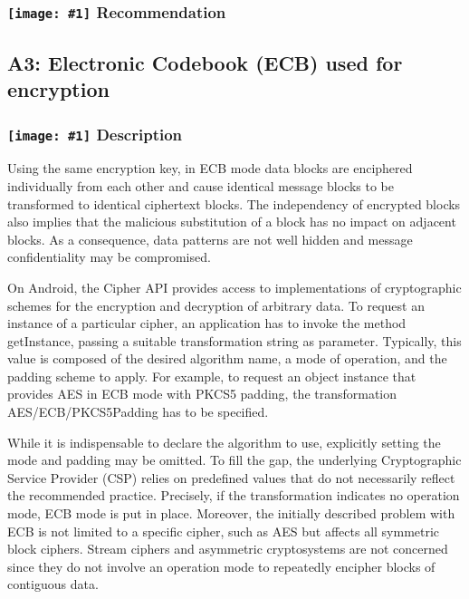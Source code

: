 \documentclass[12p]{article}
\newcommand{\icon}[1]{\texttt{[image: \#1]}}
\begin{document}
\subsubsection*{\protect\icon{/home/miki/Documents/GITHUB/AndroidPermissions/python/vulns/report_icons/basic_todo.png} Recommendation}

\subsection{A3: Electronic Codebook (ECB) used for encryption}
\subsubsection*{\protect\icon{/home/miki/Documents/GITHUB/AndroidPermissions/python/vulns/report_icons/basic_sheet.png} Description}

            Using the same encryption key, in ECB mode data blocks are enciphered individually 
            from each other and cause identical message blocks to be transformed to identical ciphertext 
            blocks. The independency of encrypted blocks also implies that the malicious substitution of a 
            block has no impact on adjacent blocks. As a consequence, data patterns are not well hidden and 
            message confidentiality may be compromised.
            
            On Android, the Cipher API provides access to implementations of cryptographic schemes
            for the encryption and decryption of arbitrary data. To request an instance of a particular cipher,
            an application has to invoke the method getInstance, passing a suitable transformation string as
            parameter. Typically, this value is composed of the desired algorithm name, a mode of operation,
            and the padding scheme to apply. For example, to request an object instance that provides AES in
            ECB mode with PKCS5 padding, the transformation AES/ECB/PKCS5Padding has to be specified.
            
            While it is indispensable to declare the algorithm to use, explicitly setting the mode and
            padding may be omitted. To fill the gap, the underlying Cryptographic Service Provider (CSP)
            relies on predefined values that do not necessarily reflect the recommended practice. Precisely, if
            the transformation indicates no operation mode, ECB mode is put in place. Moreover, the initially
            described problem with ECB is not limited to a specific cipher, such as AES but affects all symmetric
            block ciphers. Stream ciphers and asymmetric cryptosystems are not concerned since they
            do not involve an operation mode to repeatedly encipher blocks of contiguous data.
        
\end{document}
